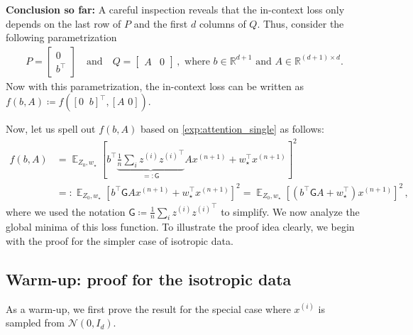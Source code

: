 \documentclass{article}
\DeclareMathOperator{\E}{\mathbb{E}}
\newcommand{\R}{\mathbb{R}}
\newcommand{\bb}{A}
\newcommand{\cc}{b}
\newcommand{\wstar}{w_\star}
\newcommand{\tz}[1]{{z^{(#1)}}}
\newcommand{\tx}[1]{x^{(#1)}}
\newcommand{\MM}{\mathsf{G}}
\begin{document}
\begin{mdframed}[linecolor=black!40,linewidth=0.5pt,innertopmargin=3pt,innerleftmargin=3pt,innerrightmargin=3pt,innerbottommargin=3pt]
\textbf{Conclusion so far:} A careful inspection reveals that the in-context loss  only depends on the last row of $P$ and the first $d$ columns of $Q$. 
Thus, consider the following parametrization
\begin{align} \label{exp:simplify}
P = \begin{bmatrix}
0\\
\cc^\top
\end{bmatrix}\quad \text{and} \quad Q=\begin{bmatrix}
\bb & 0 
\end{bmatrix}\,, \text{ where $\cc\in\R^{d+1}$ and $\bb\in \R^{(d+1)\times d}$}.
\end{align}
Now with this parametrization, the in-context loss can be written as $f(\cc,\bb) \coloneqq  f([0 \,\,\ \cc]^\top, [\bb \,\, 0])$.  
\end{mdframed}

Now, let us spell out $f(\cc,\bb)$ based on \eqref{exp:attention_single} as follows:
\begin{align}
f(\cc,\bb) &= \E_{Z_0,\wstar} \left[\cc^\top \underbrace{\frac{1}{n}  \sum_i \tz{i} {\tz{i}}^\top}_{=:\MM} \bb \tx{n+1} + \wstar^\top \tx{n+1} \right]^2 \\
& =: \E_{Z_0,\wstar} \left[\cc^\top \MM \bb \tx{n+1} + \wstar^\top \tx{n+1} \right]^2 = \E_{Z_0,\wstar} \left[(\cc^\top \MM \bb   + \wstar^\top) \tx{n+1} \right]^2 \,, \label{exp:loss_single}
\end{align}
where we used the notation $\MM \coloneqq \frac{1}{n}  \sum_i \tz{i} {\tz{i}}^\top$ to simplify.
We now analyze the global minima of this loss function.
To illustrate the proof idea clearly, we begin with the proof for the simpler case of isotropic data.

\subsection{Warm-up: proof for the isotropic data} \label{e:single_layer_non_isotropic_proof}

As a warm-up, we first prove the result for the special case where  $\tx{i}$ is sampled from $\mathcal{N}(0, I_d)$.  
\end{document}
